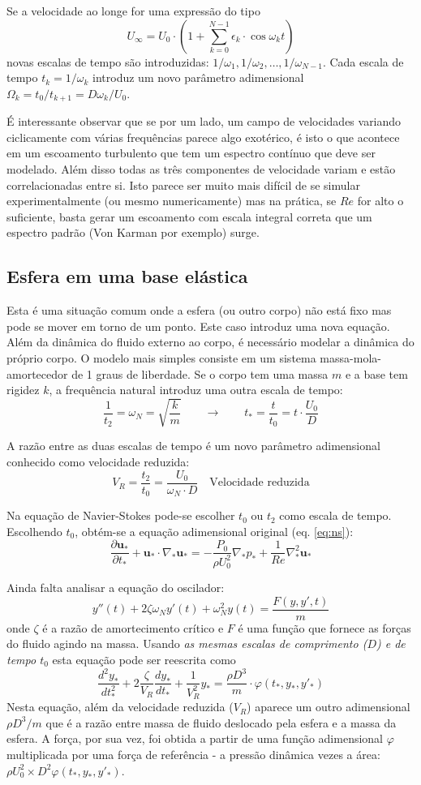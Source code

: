 \documentclass[article,12pt,oneside,a4paper,english,brazil,sumario=tradicional]{abntex2}
\newcommand{\p}[1]{\ensuremath{ \mathbf{#1}}}    %
\newcommand{\lra}{\ensuremath{\longrightarrow}}
\newcommand{\qqrq}{\ensuremath{\qquad\lra\qquad}}
\newcommand{\pd}{\ensuremath{\partial}}
\begin{document}
Se a velocidade ao longe for uma expressão do tipo 
\[
U_\infty = U_0\cdot\left(1 + \sum_{k=0}^{N-1}\epsilon_k\cdot\cos \omega_k t\right)
\]
novas escalas de tempo são introduzidas: $1/\omega_1, 1/\omega_2, \ldots, 1/\omega_{N-1}$. Cada escala de tempo $t_k = 1/\omega_k$ introduz um novo parâmetro adimensional $\Omega_k = t_0/t_{k+1} = D\omega_k/U_0$.

É interessante observar que se por um lado, um campo de velocidades variando ciclicamente com várias frequências parece algo exotérico, é isto o que acontece em um escoamento turbulento que tem um espectro contínuo que deve ser modelado. Além disso todas as três componentes de velocidade variam e estão correlacionadas entre si. Isto parece ser muito mais difícil de se simular experimentalmente (ou mesmo numericamente) mas na prática, se $Re$ for alto o suficiente, basta gerar um escoamento com escala integral correta que um espectro padrão (Von Karman por exemplo) surge.

\subsection{Esfera em uma base elástica}
Esta é uma situação comum onde a esfera (ou outro corpo) não está fixo mas pode se mover em torno de um ponto. Este caso introduz uma nova equação. Além da dinâmica do fluido externo ao corpo, é necessário modelar a dinâmica do próprio corpo. O modelo mais simples consiste em um sistema massa-mola-amortecedor de 1 graus de liberdade. Se o corpo tem uma massa $m$ e a base tem rigidez $k$, a frequência natural introduz uma outra escala de tempo:
\[
\frac{1}{t_2}  = \omega_N = \sqrt{\frac{k}{m}} \qqrq t_* = \frac{t}{t_0} = t\cdot \frac{U_0}{D}
\]

A razão entre as duas escalas de tempo é um novo parâmetro adimensional conhecido como velocidade reduzida:
\[
V_R = \frac{t_2}{t_0} = \frac{U_0}{\omega_N\cdot D} \quad \text{Velocidade reduzida}
\]

 Na equação de Navier-Stokes pode-se escolher $t_0$ ou $t_2$ como escala de tempo. Escolhendo $t_0$, obtém-se a equação adimensional original (eq. \ref{eq:ns}):
\[
\frac{\pd\p{u}_*}{\pd t_*} + \p{u}_*\cdot\nabla_*\p{u_*} = -\frac{P_0}{\rho U_0^2}\nabla_* p_* + \frac{1}{Re}\nabla_*^2\p{u}_* 
\]

Ainda falta analisar a equação do oscilador:
\[
y''(t) + 2\zeta\omega_Ny'(t) + \omega_N^2y(t) = \frac{F(y, y', t)}{m}
\]
onde $\zeta$ é a razão de amortecimento crítico e $F$ é uma função que fornece as forças do fluido agindo na massa. Usando \emph{as mesmas escalas de comprimento ($D$) e de tempo $t_0$} esta equação pode ser reescrita como
\[
\frac{d^2y_*}{dt_*^2} + 2\frac{\zeta}{V_R} \frac{dy_*}{dt_*} + \frac{1}{V_R^2} y_* = \frac{\rho D^3}{m} \cdot \varphi\left(t_*, y_*, y'_*\right)
\]
Nesta equação, além da velocidade reduzida ($V_R$) aparece um outro adimensional $\rho D^3/m$ que é a razão entre massa de fluido deslocado pela esfera e a massa da esfera. A força, por sua vez, foi obtida a partir de uma função adimensional $\varphi$ multiplicada por uma força de referência - a pressão dinâmica vezes a área: $\rho U_0^2 \times D^2 \varphi(t_*, y_*, y'_*)$.
\end{document}
